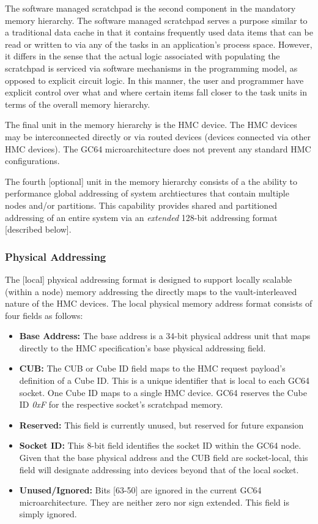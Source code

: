 \documentclass{article}
\begin{document}
The software managed scratchpad is the second component in the mandatory 
memory hierarchy.  The software managed scratchpad serves a purpose similar to 
a traditional data cache in that it contains frequently used data items that
can be read or written to via any of the tasks in an application's process space.
However, it differs in the sense that the actual logic associated with populating
the scratchpad is serviced via software mechanisms in the programming model, 
as opposed to explicit circuit logic.  In this manner, the user and programmer
have explicit control over what and where certain items fall closer to the task 
units in terms of the overall memory hierarchy.  

The final unit in the memory hierarchy is the HMC device.  The HMC devices
may be interconnected directly or via routed devices (devices connected
via other HMC devices).  The GC64 microarchitecture does not prevent
any standard HMC configurations. 

The fourth [optional] unit in the memory hierarchy consists of a the ability 
to performance global addressing of system archtiectures that contain multiple
nodes and/or partitions.  This capability provides shared and partitioned addressing
of an entire system via an \emph{extended} 128-bit addressing format 
[described below].

\subsubsection{Physical Addressing}

The [local] physical addressing format is designed to support locally scalable
(within a node) memory addressing the directly maps to the vault-interleaved
nature of the HMC devices.  The local physical memory address format consists
of four fields as follows: 

\begin{itemize}
\item \textbf{Base Address:} The base address is a 34-bit physical address unit
that maps directly to the HMC specification's base physical addressing field.  
\item \textbf{CUB:} The CUB or Cube ID field maps to the HMC request payload's 
definition of a Cube ID.  This is a unique identifier that is local to each GC64
socket.  One Cube ID maps to a single HMC device.  GC64 reserves the Cube ID
\emph{0xF} for the respective socket's scratchpad memory.  
\item \textbf{Reserved:} This field is currently unused, but reserved for future
expansion
\item \textbf{Socket ID:} This 8-bit field identifies the socket ID within the GC64 node.
Given that the base physical address and the CUB field are socket-local, this field
will designate addressing into devices beyond that of the local socket.  
\item \textbf{Unused/Ignored:} Bits [63-50] are ignored in the current GC64
microarchitecture.  They are neither zero nor sign extended.  This field is simply
ignored.  
\end{itemize}
\end{document}
